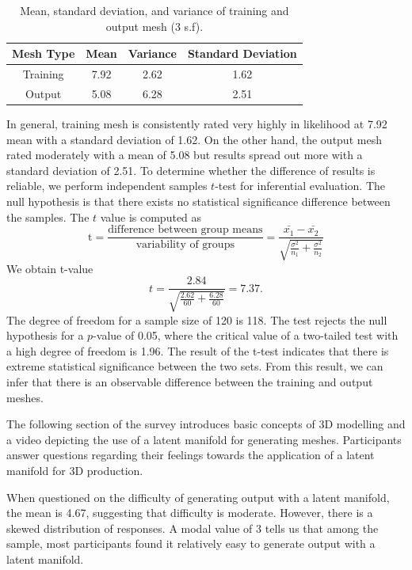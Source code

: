 \documentclass[ %
author={Dillon Keith Diep},
supervisor={Dr. Carl Henrik Ek},
degree={MEng},
title={ART-CG Hair:},
subtitle={Assisted Real-time Content Generation of Stylised Virtual Hair},
type={Research},
year={2017} ]{dissertation}
\begin{document}
\begin{table}[!h]
	\centering
	\begin{tabular}{|c|c|c|c|}
		\hline
		Mesh Type 	& Mean		& Variance	& Standard Deviation\\
		\hline
		Training 	& 7.92      & 2.62		& 1.62\\
		\hline
		Output 		& 5.08 		& 6.28 		& 2.51\\
		\hline
	\end{tabular}
	\caption{Mean, standard deviation, and variance of training and output mesh (3 s.f).}
\end{table}

In general, training mesh is consistently rated very highly in likelihood at 7.92 mean with a standard deviation of 1.62. On the other hand, the output mesh rated moderately with a mean of 5.08 but results spread out more with a standard deviation of 2.51. To determine whether the difference of results is reliable, we perform independent samples $t$-test for inferential evaluation. The null hypothesis is that there exists no statistical significance difference between the samples. The $t$ value is computed as
$$\text{t}=\frac{\text{difference between group means}}{\text{variability of groups}}=\frac{\bar{x_1}-\bar{x_2}}{\sqrt{\frac{\sigma^2}{n_1}+\frac{\sigma^2}{n_2}}}$$
We obtain t-value
$$t = \frac{2.84}{\sqrt{\frac{2.62}{60}+\frac{6.28}{60}}}=7.37.$$
The degree of freedom for a sample size of 120 is 118. The test rejects the null hypothesis for a $p$-value of 0.05, where the critical value of a two-tailed test with a high degree of freedom is 1.96. The result of the t-test indicates that there is extreme statistical significance between the two sets. From this result, we can infer that there is an observable difference between the training and output meshes.

The following section of the survey introduces basic concepts of 3D modelling and a video depicting the use of a latent manifold for generating meshes. Participants answer questions regarding their feelings towards the application of a latent manifold for 3D production.

When questioned on the difficulty of generating output with a latent manifold, the mean is 4.67, suggesting that difficulty is moderate. However, there is a skewed distribution of responses. A modal value of 3 tells us that among the sample, most participants found it relatively easy to generate output with a latent manifold.
\end{document}
